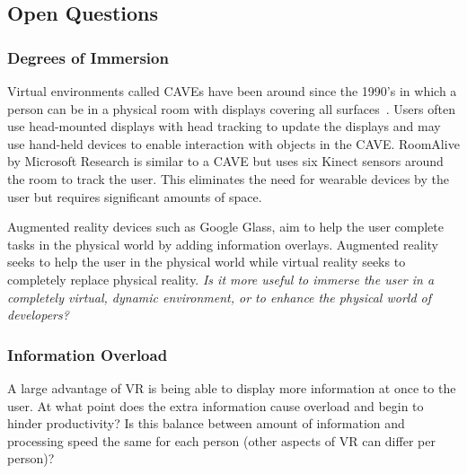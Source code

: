 \documentclass[conference]{IEEEtran}
\begin{document}
\subsection{Open Questions}


\subsubsection{Degrees of Immersion}

Virtual environments called CAVEs have been around since the 1990's in which a person can be in a physical room with displays covering all surfaces~\cite{Cruz-Neira:CAVE}.  
Users often use head-mounted displays with head tracking to update the displays and may use hand-held devices to enable interaction with objects in the CAVE.
RoomAlive by Microsoft Research is similar to a CAVE but uses six Kinect sensors around the room to track the user.  This eliminates the need for wearable devices by the user but requires significant amounts of space.~\cite{Jones:RoomAlive}

Augmented reality devices such as Google Glass, aim to help the user complete tasks in the physical world by adding information overlays. 
Augmented reality seeks to help the user in the physical world while virtual reality seeks to completely replace physical reality. 
\emph{Is it more useful to immerse the user in a completely virtual, dynamic environment, or to enhance the physical world of developers?}

\subsubsection{Information Overload}
A large advantage of VR is being able to display more information at once to the user.  
At what point does the extra information cause overload and begin to hinder productivity?  
Is this balance between amount of information and processing speed the same for each person (other aspects of VR can differ per person)?


\end{document}
